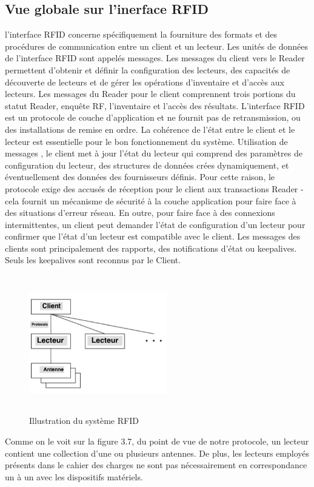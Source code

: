 \documentclass[11pt, a4paper, twoside]{book}
\begin{document}
\subsection{Vue globale sur l'inerface RFID}
l'interface RFID concerne spécifiquement la fourniture des formats et des procédures de communication entre un client et un lecteur. Les unités de données de l'interface RFID sont appelés messages. Les messages du client vers le Reader permettent d'obtenir et définir la configuration des lecteurs, des capacités de découverte de lecteurs et de gérer les opérations d'inventaire et d'accès aux lecteurs. Les messages du Reader pour le client comprennent trois portions du statut Reader, enquête RF, l'inventaire et l'accès des résultats. L'interface RFID est un protocole de couche d'application et ne fournit pas de retransmission, ou des installations de remise en ordre. La cohérence de l'état entre le client et le lecteur est essentielle pour le bon fonctionnement du système. Utilisation de messages , le client met à jour l'état du lecteur qui comprend des paramètres de configuration du lecteur, des structures de données crées dynamiquement, et éventuellement des données des fournisseurs définis. Pour cette raison, le protocole exige des accusés de réception pour le client aux transactions Reader - cela fournit un mécanisme de sécurité à la couche application pour faire face à des situations d'erreur réseau. En outre, pour faire face à des connexions intermittentes, un client peut demander l'état de configuration d'un lecteur pour confirmer que l'état d'un lecteur est compatible avec le client. Les messages des clients sont principalement des rapports, des notifications d'état ou keepalives. Seuls les keepalives sont reconnus par le Client.
\begin{figure}[!h]
\centering
\includegraphics[width=6cm,height=6cm]{lim}
\caption{Illustration du système RFID}
\end{figure}
Comme on le voit sur la figure 3.7, du point de vue de notre protocole, un lecteur contient une collection d'une ou plusieurs antennes. De plus, les lecteurs employés  présents dans le cahier des charges ne sont pas nécessairement en correspondance un à un avec les dispositifs matériels.
\end{document}
